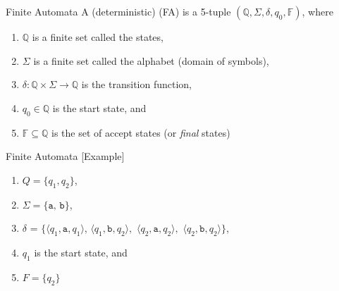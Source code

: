 \documentclass[10pt, aspectratio=169]{beamer}
\begin{document}
\begin{frame}{Finite Automata}
	A (deterministic)  (FA) is a 5-tuple $(\mathbb{Q}, \Sigma, \delta, q_0, \mathbb{F})$, where
    \vspace{0.6em}
	\begin{enumerate}
		\item $\mathbb{Q}$ is a finite set called the \textcolor{umBlueLighter}{states},
		\item $\Sigma$ is a finite set called the \textcolor{umBlueLighter}{alphabet} (domain of symbols),
		\item $\delta : \mathbb{Q} \times \Sigma \rightarrow \mathbb{Q}$ is the \textcolor{umBlueLighter}{transition function},
		\item $q_0 \in \mathbb{Q}$ is the \textcolor{umBlueLighter}{start state}, and
		\item $\mathbb{F} \subseteq \mathbb{Q}$ is the set of \textcolor{umBlueLighter}{accept states} (or \textit{final} states)
	\end{enumerate}
\end{frame}

\begin{frame}{Finite Automata [Example]}
\begin{figure}[H]
	\centering
\end{figure}

    \begin{enumerate}
        \item $Q=\{q_1, q_2\}$,
        \item $\Sigma = \{\texttt{a, b}\}$,
        \item $\delta$ = $\{\langle q_1, \texttt{a}, q_1 \rangle $, $\langle q_1, \texttt{b}, q_2 \rangle,$ $\langle q_2, \texttt{a}, q_2 \rangle,$ $\langle q_2, \texttt{b}, q_2 \rangle \}$,
        \item $q_1$ is the start state, and
        \item $F = \{q_2\}$
    \end{enumerate}
\end{frame}
\end{document}
